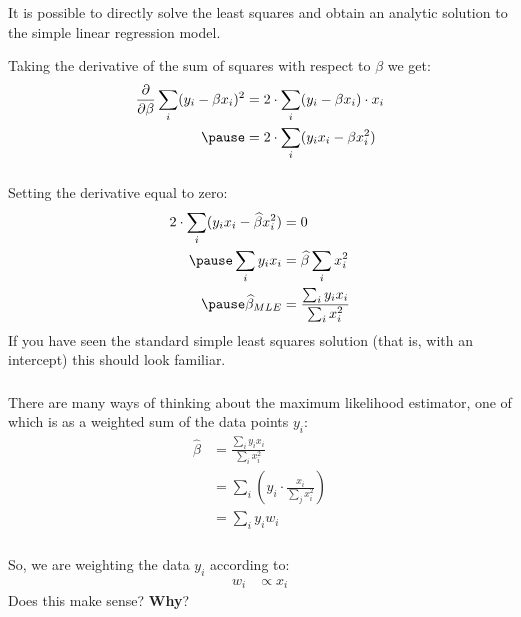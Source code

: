 \begin{frame}[fragile] \frametitle{}

It is possible to directly solve the least squares and obtain
an analytic solution to the simple linear regression model.

Taking the derivative of the sum of squares with respect to
$\beta$ we get:
\begin{eqnarray*}
\frac{\partial}{\partial \beta} \sum_i (y_i - \beta x_i)^2
  &= 2 \cdot \sum_i ( y_i - \beta x_i) \cdot x_i \\ \pause
  &= 2 \cdot \sum_i ( y_i x_i - \beta x_i^2)
\end{eqnarray*}


\end{frame}

\begin{frame}[fragile] \frametitle{}

Setting the derivative equal to zero:
\begin{eqnarray*}
2 \cdot \sum_i ( y_i x_i - \widehat{\beta} x_i^2) &= 0 \\ \pause
\sum_i y_i x_i &= \widehat{\beta} \sum_i x_i^2 \\ \pause
\widehat{\beta}_{MLE} &= \frac{\sum_i y_i x_i}{\sum_i x_i^2}
\end{eqnarray*}
\pause If you have seen the standard simple least squares solution
(that is, with an intercept) this should look familiar.

\end{frame}


\begin{frame}[fragile] \frametitle{}

There are many ways of thinking about the maximum likelihood estimator,
one of which is as a weighted sum of the data points $y_i$:
\begin{align*}
\widehat{\beta} &= \frac{\sum_i y_i x_i}{\sum_i x_i^2} \\
&= \sum_i \left( y_i \cdot \frac{x_i}{\sum_j x_i^2} \right) \\
&= \sum_i y_i w_i
\end{align*}

\end{frame}

\begin{frame}[fragile] \frametitle{}

So, we are weighting the data $y_i$ according to:
\begin{align*}
w_i &\propto x_i
\end{align*}
Does this make sense? {\bf Why}?

\end{frame}

